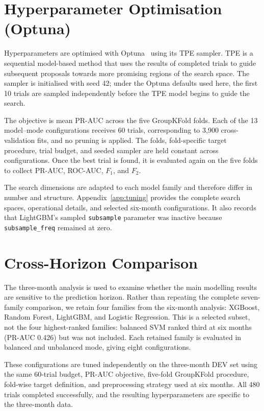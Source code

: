 \section{Hyperparameter Optimisation (Optuna)}
\label{sec:methods_optuna}
Hyperparameters are optimised with Optuna~\cite{optuna2019} using its \gls{TPE} sampler. TPE is a sequential model-based method that uses the results of completed trials to guide subsequent proposals towards more promising regions of the search space. The sampler is initialised with seed 42; under the Optuna defaults used here, the first 10 trials are sampled independently before the TPE model begins to guide the search.

The objective is mean \gls{PR-AUC} across the five GroupKFold folds. Each of the 13 model--mode configurations receives 60 trials, corresponding to 3,900 cross-validation fits, and no pruning is applied. The folds, fold-specific target procedure, trial budget, and seeded sampler are held constant across configurations. Once the best trial is found, it is evaluated again on the five folds to collect \gls{PR-AUC}, \gls{ROC-AUC}, $F_1$, and $F_2$.

The search dimensions are adapted to each model family and therefore differ in number and structure. Appendix~\ref{app:tuning} provides the complete search spaces, operational details, and selected six-month configurations. It also records that LightGBM's sampled \texttt{subsample} parameter was inactive because \texttt{subsample\_freq} remained at zero.

\section{Cross-Horizon Comparison}
\label{sec:methods_cross_horizon}
The three-month analysis is used to examine whether the main modelling results are sensitive to the prediction horizon. Rather than repeating the complete seven-family comparison, we retain four families from the six-month analysis: XGBoost, Random Forest, LightGBM, and Logistic Regression. This is a selected subset, not the four highest-ranked families: balanced SVM ranked third at six months (PR-AUC 0.426) but was not included. Each retained family is evaluated in balanced and unbalanced mode, giving eight configurations.

These configurations are tuned independently on the three-month DEV set using the same 60-trial budget, \gls{PR-AUC} objective, five-fold GroupKFold procedure, fold-wise target definition, and preprocessing strategy used at six months. All 480 trials completed successfully, and the resulting hyperparameters are specific to the three-month data.

